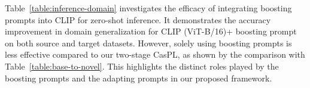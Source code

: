 Table~\ref{table:inference-domain} investigates the efficacy of integrating boosting prompts into CLIP for zero-shot inference. It demonstrates the accuracy improvement in domain generalization for CLIP (ViT-B/16)+ boosting prompt on both source and target datasets. However, solely using boosting prompts is less effective compared to our two-stage CasPL, as shown by the comparison with Table~\ref{table:base-to-novel}. This highlights the distinct roles played by the boosting prompts and the adapting prompts in our proposed framework.

